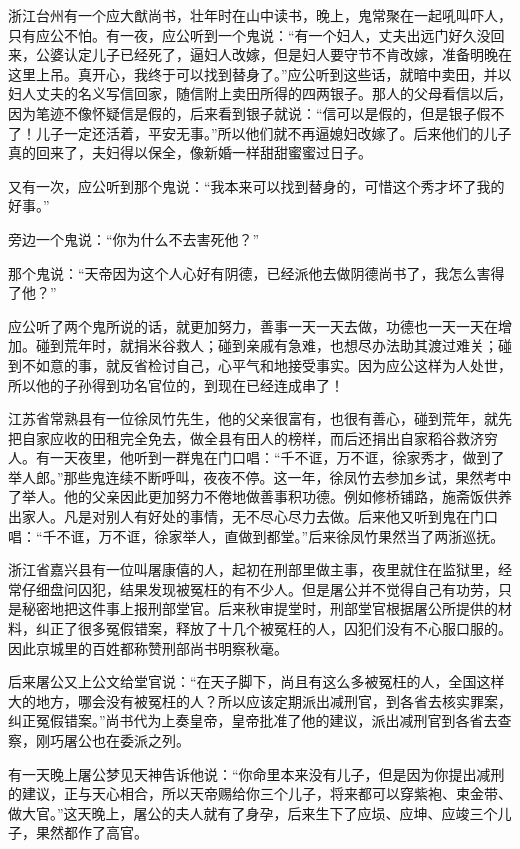 \documentclass[12pt,UTF8]{ctexbook}
\begin{document}
浙江台州有一个应大猷尚书，壮年时在山中读书，晚上，鬼常聚在一起吼叫吓人，只有应公不怕。有一夜，应公听到一个鬼说：“有一个妇人，丈夫出远门好久没回来，公婆认定儿子已经死了，逼妇人改嫁，但是妇人要守节不肯改嫁，准备明晚在这里上吊。真开心，我终于可以找到替身了。”应公听到这些话，就暗中卖田，并以妇人丈夫的名义写信回家，随信附上卖田所得的四两银子。那人的父母看信以后，因为笔迹不像怀疑信是假的，后来看到银子就说：“信可以是假的，但是银子假不了！儿子一定还活着，平安无事。”所以他们就不再逼媳妇改嫁了。后来他们的儿子真的回来了，夫妇得以保全，像新婚一样甜甜蜜蜜过日子。

又有一次，应公听到那个鬼说：“我本来可以找到替身的，可惜这个秀才坏了我的好事。”

旁边一个鬼说：“你为什么不去害死他？”

那个鬼说：“天帝因为这个人心好有阴德，已经派他去做阴德尚书了，我怎么害得了他？”

应公听了两个鬼所说的话，就更加努力，善事一天一天去做，功德也一天一天在增加。碰到荒年时，就捐米谷救人；碰到亲戚有急难，也想尽办法助其渡过难关；碰到不如意的事，就反省检讨自己，心平气和地接受事实。因为应公这样为人处世，所以他的子孙得到功名官位的，到现在已经连成串了！

江苏省常熟县有一位徐凤竹先生，他的父亲很富有，也很有善心，碰到荒年，就先把自家应收的田租完全免去，做全县有田人的榜样，而后还捐出自家稻谷救济穷人。有一天夜里，他听到一群鬼在门口唱：“千不诓，万不诓，徐家秀才，做到了举人郎。”那些鬼连续不断呼叫，夜夜不停。这一年，徐凤竹去参加乡试，果然考中了举人。他的父亲因此更加努力不倦地做善事积功德。例如修桥铺路，施斋饭供养出家人。凡是对别人有好处的事情，无不尽心尽力去做。后来他又听到鬼在门口唱：“千不诓，万不诓，徐家举人，直做到都堂。”后来徐凤竹果然当了两浙巡抚。

浙江省嘉兴县有一位叫屠康僖的人，起初在刑部里做主事，夜里就住在监狱里，经常仔细盘问囚犯，结果发现被冤枉的有不少人。但是屠公并不觉得自己有功劳，只是秘密地把这件事上报刑部堂官。后来秋审提堂时，刑部堂官根据屠公所提供的材料，纠正了很多冤假错案，释放了十几个被冤枉的人，囚犯们没有不心服口服的。因此京城里的百姓都称赞刑部尚书明察秋毫。

后来屠公又上公文给堂官说：“在天子脚下，尚且有这么多被冤枉的人，全国这样大的地方，哪会没有被冤枉的人？所以应该定期派出减刑官，到各省去核实罪案，纠正冤假错案。”尚书代为上奏皇帝，皇帝批准了他的建议，派出减刑官到各省去查察，刚巧屠公也在委派之列。

有一天晚上屠公梦见天神告诉他说：“你命里本来没有儿子，但是因为你提出减刑的建议，正与天心相合，所以天帝赐给你三个儿子，将来都可以穿紫袍、束金带、做大官。”这天晚上，屠公的夫人就有了身孕，后来生下了应埙、应坤、应竣三个儿子，果然都作了高官。
\end{document}
